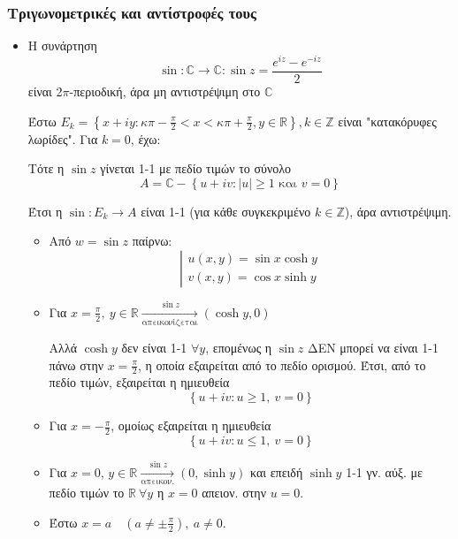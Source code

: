 \documentclass[12pt,a4paper,titlepage,fleqn]{article}
\begin{document}
     \subsubsection{Τριγωνομετρικές και αντίστροφές τους}
     
     \begin{itemize}
     	\item Η συνάρτηση
     	\[
     	\sin: \mathbb C \to \mathbb C : \sin z = \frac{e^{iz}-e^{-iz}}{2}
     	\] είναι 2\( \pi \)-περιοδική, άρα μη αντιστρέψιμη στο \( \mathbb C  \)
     	
     	Έστω \( 
     	E_k = \left\lbrace 
     	x+iy: \kappa \pi -\frac{\pi}{2}<x<\kappa\pi+\frac{\pi}{2},y\in\mathbb R
     	 \right\rbrace, k \in \mathbb Z
     	 \) είναι "κατακόρυφες λωρίδες". Για \underline{\( k=0 \)}, έχω:
     	 
     	 Τότε η \( \sin z \) γίνεται 1-1 με πεδίο τιμών το σύνολο
     	 \[
     	 A = \mathbb C - \left\lbrace u+iv: |u| \geq 1 \text{ και }
     	 v = 0
     	  \right\rbrace
     	 \]
     	 
     	 Έτσι η \( \sin: E_k \to A \) είναι 1-1 (για κάθε συγκεκριμένο \( k\in
     	 \mathbb Z
     	  \)), άρα αντιστρέψιμη.
     	  
     	  \begin{itemize}
     	  	\item Από \( w=\sin z \) παίρνω: \[
     	  	\left| \begin{array}{l}
     	  	u(x,y) = \sin x \cosh y \\ v(x,y) = \cos x\sinh y
     	  	\end{array} \right.
     	  	\]
     	  	\item Για \( x=\frac{\pi}{2},\ y\in\mathbb R 
     	  	\xrightarrow[\text{απεικονίζεται}]{\sin z} (\cosh y,0 )
     	  	 \)
     	  	 
     	  	 Αλλά \( \cosh y \) δεν είναι 1-1 \( \forall y \), επομένως η
     	  	 \( \sin z \) ΔΕΝ μπορεί να είναι 1-1 πάνω στην \( x=\frac{\pi}{2} \), η
     	  	 οποία εξαιρείται από το πεδίο ορισμού. Έτσι, από το πεδίο τιμών,
     	  	 εξαιρείται η ημιευθεία \[ \left\lbrace
     	  	 u+iv: u \geq 1,\ v = 0 \right\rbrace
     	  	 \]
     	  	 \item Για \( x=-\frac{\pi}{2} \), ομοίως εξαιρείται η ημιευθεία \[
     	  	 \left\lbrace
     	  	 u+iv: u \leq 1,\ v = 0 \right\rbrace
     	  	 \]
     	  	 \item Για \underline{\( x = 0 \)}, \( y\in\mathbb R
     	  	 \xrightarrow[\text{απεικον.}]{\sin z}
     	  	 (0, \sinh y)
     	  	  \) και επειδή \( \sinh y \) 1-1 γν. αύξ. με πεδίο τιμών το
     	  	  \( \mathbb R \ \forall y \) η \( x = 0 \) απειον. στην \( u=0 \).
     	  	 \item Έστω \( x=a \quad (a \neq \pm \frac{\pi}{2}),\ a\neq 0 \).
     	  	 

\end{itemize}
\end{itemize}
\end{document}
